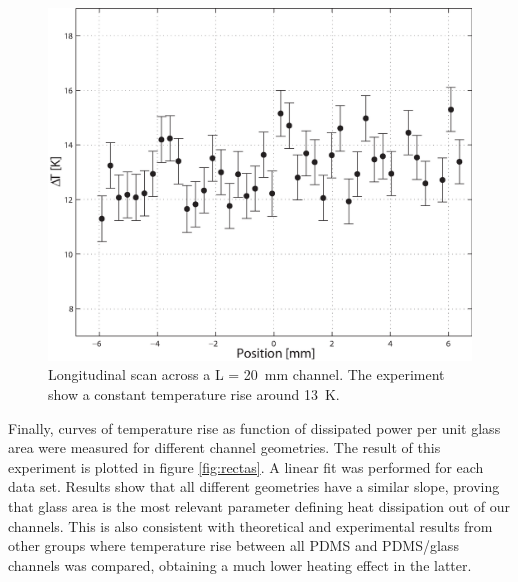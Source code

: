 \documentclass[9pt,twocolumn,twoside]{osajnl}
\begin{document}

\begin{figure}[htbp]
\centering
\includegraphics[width=\columnwidth]{figs/fig7.eps}
\caption{Longitudinal scan across a L = 20~mm channel. The experiment show a constant temperature rise around 13~K.\label{fig:long}}
\end{figure}

Finally, curves of temperature rise as function of dissipated power per unit glass area were measured for different channel geometries. The result of this experiment is plotted in figure \ref{fig:rectas}. A linear fit was performed for each data set. Results show that all different geometries have a similar slope, proving that glass area is the most relevant parameter defining heat dissipation out of our channels. This is also consistent with theoretical and experimental results from other groups \cite{erickson2003} where temperature rise between all PDMS and PDMS/glass channels was compared, obtaining a much lower heating effect in the latter. 
\end{document}
